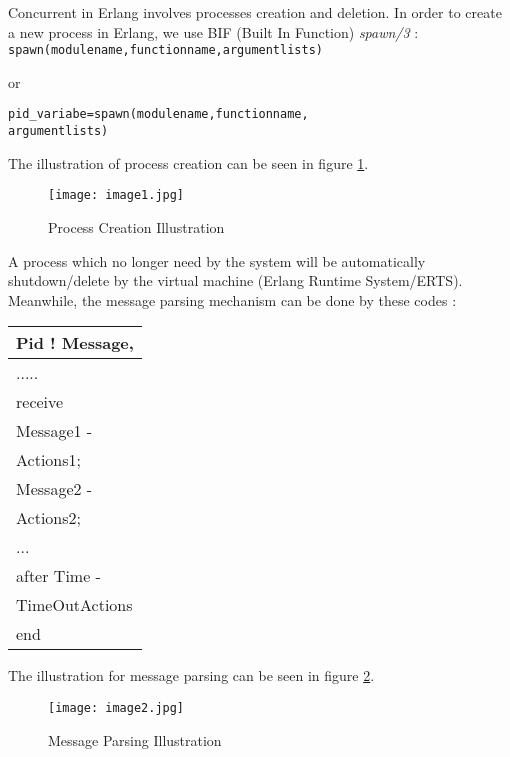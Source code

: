 \documentclass[final,
notitlepage,
narroweqnarray,
    inline,
    twoside,
]{ieee}
\begin{document}
Concurrent in Erlang involves processes creation and deletion. In
order to create a new process in Erlang, we use BIF (Built In
Function) \textit{spawn/3} :
\texttt{spawn(modulename,functionname,argumentlists)}

or

\noindent
\texttt{pid\_variabe=spawn(modulename,functionname,\\
argumentlists)}

The illustration of process creation can be seen in figure
\ref{image1}.

\begin{figure}[htbp]
\texttt{[image: image1.jpg]}
\caption{Process Creation Illustration}
\label{image1}
\end{figure}


A process which no longer need by the system will be automatically
shutdown/delete by the virtual machine (Erlang Runtime
System/ERTS). Meanwhile, the message parsing mechanism can be done
by these codes :

\begin{tabular}{|p{1.2in}|} \hline
Pid ! Message, \\ \hline
..... \\ \hline
receive \\ \hline
Message1 - \\ \hline
Actions1; \\ \hline
Message2 - \\ \hline
Actions2; \\ \hline
... \\ \hline
after Time - \\ \hline
TimeOutActions \\ \hline
end \\ \hline
\end{tabular}

The illustration for message parsing can be seen in figure
\ref{image2}.

\begin{figure}[htbp]
\texttt{[image: image2.jpg]}
\caption{Message Parsing Illustration}
\label{image2}
\end{figure}
\end{document}
